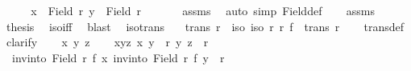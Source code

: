 \begin{isabellebody}
%
\isadelimproof
%
\endisadelimproof
%
\isatagproof
{}\isamarkupfalse%
\ {\isacharminus}{\kern0pt}\isanewline
\ \ \isamarkupfalse%
\ {\isachardoublequoteopen}x\ {\isasymin}\ Field\ r{\isachardoublequoteclose}\ {\isachardoublequoteopen}y\ {\isasymin}\ Field\ r{\isachardoublequoteclose}\ \isanewline
\ \ \ \ \isamarkupfalse%
\ assms\ \isamarkupfalse%
\ {\isacharparenleft}{\kern0pt}auto\ simp{\isacharcolon}{\kern0pt}\ Field{\isacharunderscore}{\kern0pt}def{\isacharparenright}{\kern0pt}\isanewline
\ \ \isamarkupfalse%
\ assms\ \isamarkupfalse%
\ {\isacharquery}{\kern0pt}thesis\ \isamarkupfalse%
\ iso{\isacharunderscore}{\kern0pt}iff{}\ \isamarkupfalse%
\ blast\ \isanewline
{}\isamarkupfalse%
%
\endisatagproof
{\isafoldproof}%
%
\isadelimproof
\isanewline
%
\endisadelimproof
\isanewline
\isanewline
{}\isamarkupfalse%
\ iso{\isacharunderscore}{\kern0pt}trans{\isacharcolon}{\kern0pt}\isanewline
\ \ \ {\isachardoublequoteopen}trans\ r{\isachardoublequoteclose}\ \ iso{\isacharcolon}{\kern0pt}\ {\isachardoublequoteopen}iso\ r\ r{\isacharprime}{\kern0pt}\ f{\isachardoublequoteclose}\ \ {\isachardoublequoteopen}trans\ r{\isacharprime}{\kern0pt}{\isachardoublequoteclose}\isanewline
%
\isadelimproof
\ \ %
\endisadelimproof
%
\isatagproof
{}\isamarkupfalse%
\ trans{\isacharunderscore}{\kern0pt}def\isanewline
{}\isamarkupfalse%
\ clarify\isanewline
\ \ \isamarkupfalse%
\ x\ y\ z\isanewline
\ \ \isamarkupfalse%
\ xyz{\isacharcolon}{\kern0pt}\ {\isachardoublequoteopen}{\isacharparenleft}{\kern0pt}x{\isacharcomma}{\kern0pt}\ y{\isacharparenright}{\kern0pt}\ {\isasymin}\ r{\isacharprime}{\kern0pt}{\isachardoublequoteclose}\ {\isachardoublequoteopen}{\isacharparenleft}{\kern0pt}y{\isacharcomma}{\kern0pt}\ z{\isacharparenright}{\kern0pt}\ {\isasymin}\ r{\isacharprime}{\kern0pt}{\isachardoublequoteclose}\isanewline
\ \ \isamarkupfalse%
\ \isamarkupfalse%
\ {\isacharasterisk}{\kern0pt}{\isacharcolon}{\kern0pt}\ {\isachardoublequoteopen}{\isacharparenleft}{\kern0pt}inv{\isacharunderscore}{\kern0pt}into\ {\isacharparenleft}{\kern0pt}Field\ r{\isacharparenright}{\kern0pt}\ f\ x{\isacharcomma}{\kern0pt}\ inv{\isacharunderscore}{\kern0pt}into\ {\isacharparenleft}{\kern0pt}Field\ r{\isacharparenright}{\kern0pt}\ f\ y{\isacharparenright}{\kern0pt}\ {\isasymin}\ r{\isachardoublequoteclose}\ \isanewline

\end{isabellebody}
